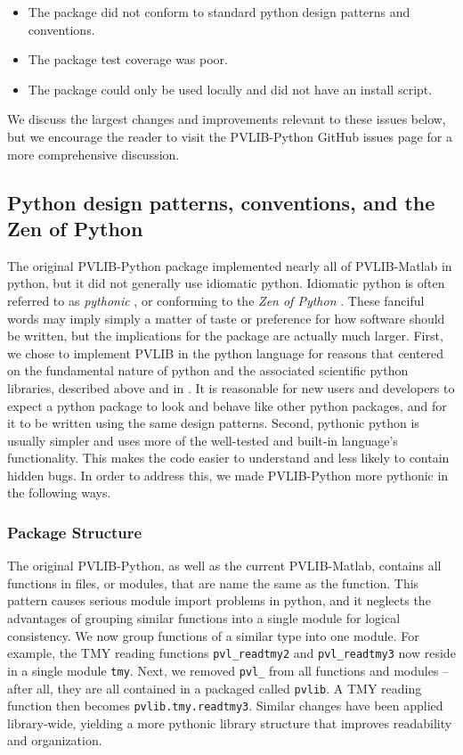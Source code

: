 \documentclass[conference]{IEEEtran}
\newcommand{\holmgren}[1]{{\bf\color{red} WH: #1}}
\begin{document}
\begin{itemize}
\item The package did not conform to standard python design patterns and conventions.
\item The package test coverage was poor. 
\item The package could only be used locally and did not have an install script.
\end{itemize}

We discuss the largest changes and improvements relevant to these issues below, but we encourage the reader to visit the PVLIB-Python GitHub issues page for a more comprehensive discussion.


\subsection{Python design patterns, conventions, and the Zen of Python}

The original PVLIB-Python package implemented nearly all of PVLIB-Matlab in python, but it did not generally use idiomatic python.
Idiomatic python is often referred to as \emph{pythonic} \cite{pythonic}, or conforming to the \emph{Zen of Python} \cite{zenofpython}. 
These fanciful words may imply simply a matter of taste or preference for how software should be written, but the implications for the package are actually much larger.
First, we chose to implement PVLIB in the python language for reasons that centered on the fundamental nature of python and the associated scientific python libraries, described above and in \cite{andrews}. 
It is reasonable for new users and developers to expect a python package to look and behave like other python packages, and for it to be written using the same design patterns.
Second, pythonic python is usually simpler and uses more of the well-tested and built-in language's functionality.
This makes the code easier to understand and less likely to contain hidden bugs.  In order to address this, we made PVLIB-Python more pythonic in the following ways.

\subsubsection{Package Structure} 
The original PVLIB-Python, as well as the current PVLIB-Matlab, contains all functions in files, or modules, that are name the same as the function. 
This pattern causes serious module import problems in python, and it neglects the advantages of grouping similar functions into a single module for logical consistency.
We now group functions of a similar type into one module. 
For example, the TMY reading functions \texttt{pvl{\_}readtmy2} and \texttt{pvl{\_}readtmy3} now reside in a single module \texttt{tmy}. 
Next, we removed \texttt{pvl{\_}} from all functions and modules -- after all, they are all contained in a packaged called \texttt{pvlib}. 
A TMY reading function then becomes \texttt{pvlib.tmy.readtmy3}. 
Similar changes have been applied library-wide, yielding a more pythonic library structure that improves readability and organization. 
\end{document}
